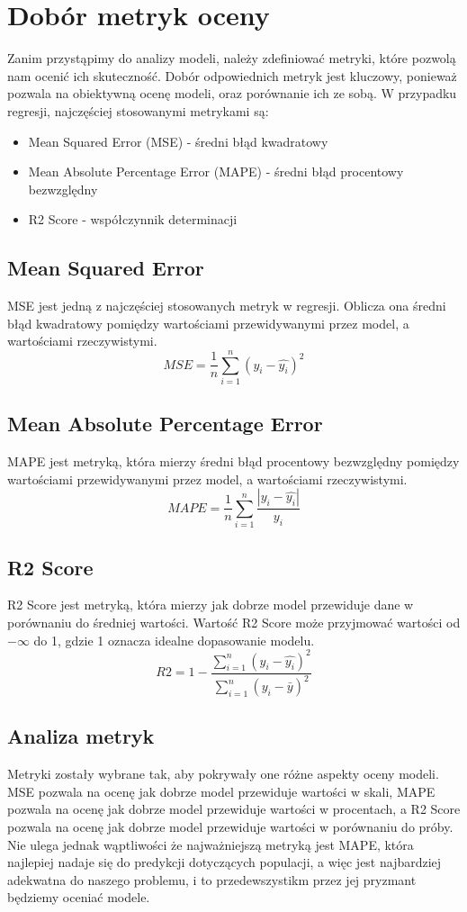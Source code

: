 \documentclass[11pt]{article}
\begin{document}
\section{Dobór metryk oceny}
Zanim przystąpimy do analizy modeli, należy zdefiniować metryki, które pozwolą nam ocenić ich skuteczność.
Dobór odpowiednich metryk jest kluczowy, ponieważ pozwala na obiektywną ocenę modeli, oraz porównanie ich ze sobą.
W przypadku regresji, najczęściej stosowanymi metrykami są:
\begin{itemize}
\item Mean Squared Error (MSE) - średni błąd kwadratowy
\item Mean Absolute Percentage Error (MAPE) - średni błąd procentowy bezwzględny
\item R2 Score - współczynnik determinacji
\end{itemize}
\subsection{Mean Squared Error}
MSE jest jedną z najczęściej stosowanych metryk w regresji. Oblicza ona średni błąd kwadratowy pomiędzy wartościami przewidywanymi przez model, a wartościami rzeczywistymi.
\begin{equation}
MSE = \frac{1}{n} \sum_{i=1}^{n} (y_i - \hat{y_i})^2
\end{equation}
\subsection{Mean Absolute Percentage Error}
MAPE jest metryką, która mierzy średni błąd procentowy bezwzględny pomiędzy wartościami przewidywanymi przez model, a wartościami rzeczywistymi.
\begin{equation}
MAPE = \frac{1}{n} \sum_{i=1}^{n} \frac{|y_i - \hat{y_i}|}{y_i}
\end{equation}
\subsection{R2 Score}
R2 Score jest metryką, która mierzy jak dobrze model przewiduje dane w porównaniu do średniej wartości. Wartość R2 Score może przyjmować wartości od $-\infty$
  do 1, gdzie 1 oznacza idealne dopasowanie modelu.
\begin{equation}
R2 = 1 - \frac{\sum_{i=1}^{n} (y_i - \hat{y_i})^2}{\sum_{i=1}^{n} (y_i - \bar{y})^2}
\end{equation}
\subsection{Analiza metryk}
Metryki zostały wybrane tak, aby pokrywały one różne aspekty oceny modeli. MSE pozwala na ocenę jak dobrze model przewiduje wartości w skali, MAPE pozwala na ocenę jak dobrze model przewiduje wartości w procentach, a R2 Score pozwala na ocenę jak dobrze model przewiduje wartości w porównaniu do próby.
Nie ulega jednak wąptliwości że najważniejszą metryką jest MAPE, która najlepiej nadaje się do predykcji dotyczących populacji\cite{dop}, a więc jest najbardziej adekwatna do naszego problemu, i to przedewszystikm przez jej pryzmant będziemy oceniać modele.
\end{document}
